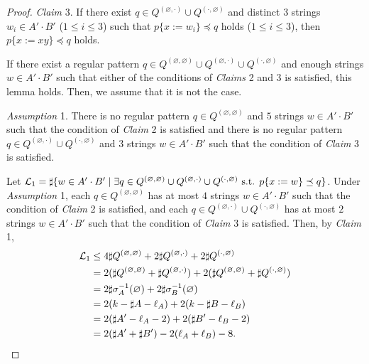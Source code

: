 \begin{proof}
\noindent
\textit{Claim} 3. If there exist $q \in Q^{(\varnothing,\cdot)} \cup Q^{(\cdot,\varnothing)}$ and distinct $3$ strings $w_{i} \in A'\cdot B'$ ($1\leq i\leq 3$) such that $p \{ x:=w_{i} \} \preceq q$ holds ($1\leq i\leq 3$),  then $p \{ x:=xy \} \preceq q$ holds.

\smallskip

\noindent
If there exist a regular pattern $q \in Q^{(\varnothing,\varnothing)} \cup Q^{(\varnothing,\cdot)} \cup Q^{(\cdot,\varnothing)}$ and enough strings $w \in A'\cdot B'$ such that either of the conditions of \textit{Claims} 2 and 3 is satisfied, this lemma holds. Then, we assume that it is not the case.

\smallskip

\noindent
\textit{Assumption} 1.
There is no regular pattern $q \in Q^{(\varnothing,\varnothing)}$ and $5$ strings $w \in A'\cdot B'$ such that the condition of \textit{Claim} 2 is satisfied and there is no regular pattern $q \in Q^{(\varnothing,\cdot)} \cup Q^{(\cdot,\varnothing)}$ and $3$ strings $w \in A'\cdot B'$ such that the condition of \textit{Claim} 3 is satisfied.

\smallskip

\noindent
Let ${\cal L}_{1} = \sharp\{w \in A'\cdot B' \mid \exists q \in Q^{(\varnothing,\varnothing)} \cup Q^{(\varnothing,\cdot)} \cup Q^{(\cdot,\varnothing)} \mbox{ s.t. } p\{x:=w\} \preceq q\}$.
Under \textit{Assumption} 1, each $q\in Q^{(\varnothing,\varnothing)}$ has at most $4$ strings $w \in A'\cdot B'$ such that the condition of \textit{Claim} 2 is satisfied, and each $q \in Q^{(\varnothing,\cdot)} \cup Q^{(\cdot,\varnothing)}$ has at most $2$ strings $w \in A'\cdot B'$ such that the condition of \textit{Claim} 3 is satisfied.
Then, by \textit{Claim} 1,
\begin{align*}
  {\cal L}_{1} &\leq 4\sharp Q^{(\varnothing,\varnothing)} + 2\sharp Q^{(\varnothing,\cdot)} + 2\sharp Q^{(\cdot,\varnothing)}\\
  & = 2(\sharp Q^{(\varnothing,\varnothing)} + \sharp Q^{(\varnothing,\cdot)}) + 2(\sharp Q^{(\varnothing,\varnothing)} + \sharp Q^{(\cdot,\varnothing)})\\
  & = 2\sharp \sigma_{A}^{-1}(\varnothing) + 2\sharp \sigma_{B}^{-1}(\varnothing)\\
  & = 2(k - \sharp A - \ell_{A}) + 2(k - \sharp B - \ell_{B})\\
  & = 2(\sharp A' - \ell_{A} - 2) + 2(\sharp B' - \ell_{B} - 2)\\
  & = 2(\sharp A' + \sharp B') - 2(\ell_{A} + \ell_{B}) - 8.
\end{align*}


\end{proof}
